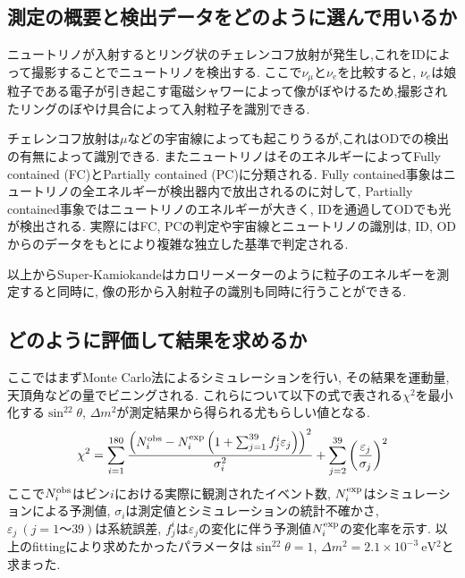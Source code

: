 \documentclass[uplatex,a4j,11pt,dvipdfmx]{jsarticle}
\begin{document}
\subsection*{測定の概要と検出データをどのように選んで用いるか}
ニュートリノが入射するとリング状のチェレンコフ放射が発生し,これをIDによって撮影することでニュートリノを検出する.
ここで$\nu_\mu$と$\nu_e$を比較すると,
$\nu_e$は娘粒子である電子が引き起こす電磁シャワーによって像がぼやけるため,撮影されたリングのぼやけ具合によって入射粒子を識別できる.\cite{kamioka:online}

チェレンコフ放射は$\mu$などの宇宙線によっても起こりうるが,これはODでの検出の有無によって識別できる.
またニュートリノはそのエネルギーによってFully contained (FC)とPartially contained (PC)に分類される.
Fully contained事象はニュートリノの全エネルギーが検出器内で放出されるのに対して,
Partially contained事象ではニュートリノのエネルギーが大きく, 
IDを通過してODでも光が検出される.
実際にはFC, PCの判定や宇宙線とニュートリノの識別は,
ID, ODからのデータをもとにより複雑な独立した基準で判定される.

以上からSuper-Kamiokandeはカロリーメーターのように粒子のエネルギーを測定すると同時に,
像の形から入射粒子の識別も同時に行うことができる.
\subsection*{どのように評価して結果を求めるか}
ここではまずMonte Carlo法によるシミュレーションを行い,
その結果を運動量,天頂角などの量でビニングされる.
これらについて以下の式で表される$\chi^2$を最小化する$\sin^22\theta$, $\Delta m^2$が測定結果から得られる尤もらしい値となる.
\begin{align}
  \chi^2=\sum_{i=1}^{180}\frac{\left(N_i^{\rm obs}-N_i^{\rm exp}\left(1+\sum_{j=1}^{39}f_j^i\varepsilon_j\right)\right)^2}{\sigma_i^2}+\sum_{j=2}^{39}\left(\frac{\varepsilon_j}{\sigma_j}\right)^2
\end{align}
ここで$N_i^{\rm obs}$はビン$i$における実際に観測されたイベント数,
$N_i^{\rm exp}$はシミュレーションによる予測値,
$\sigma_i$は測定値とシミュレーションの統計不確かさ,
$\varepsilon_j\ (j=1〜39)$は系統誤差,
$f_j^i$は$\varepsilon_j$の変化に伴う予測値$N_i^{\rm exp}$の変化率を示す.
以上のfittingにより求めたかったパラメータは$\sin^22\theta=1$, $\Delta m^2=2.1\times10^{-3}\ \si{\electronvolt^2}$と求まった.

\end{document}
